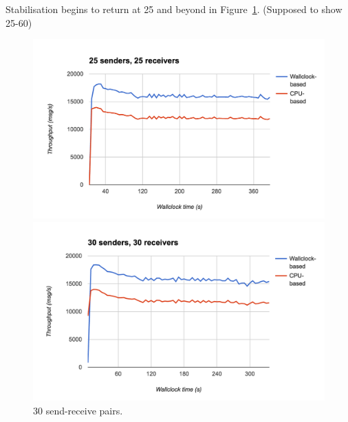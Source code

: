 Stabilisation begins to return at 25 and beyond in Figure~\ref{fig:lots}. (Supposed to show 25-60)
\begin{figure}
  \centering\includegraphics[width=\textwidth]{../transcripts/lipsum/25n25/25n25.png}

  \centering\includegraphics[width=\textwidth]{../transcripts/lipsum/30n30/30n30.png}
  \caption{30 send-receive pairs.}
  \label{fig:lots}
\end{figure}
